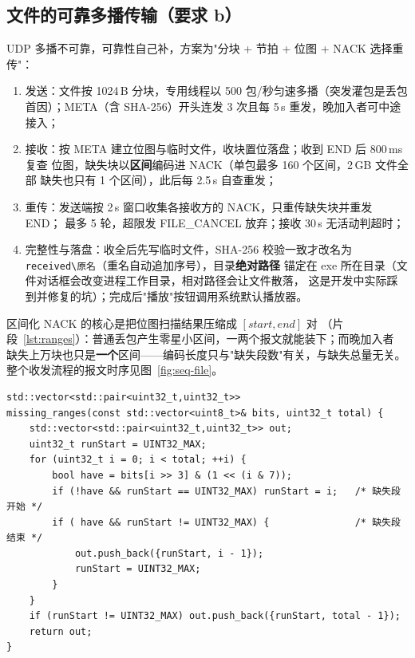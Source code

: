 \documentclass[11pt,a4paper,fontset=fandol]{ctexart}
\begin{document}
\subsection{文件的可靠多播传输（要求 b）}

UDP 多播不可靠，可靠性自己补，方案为"分块 + 节拍 + 位图 + NACK 选择重传"：

\begin{enumerate}[itemsep=1pt,topsep=2pt]
  \item 发送：文件按 1024\,B 分块，专用线程以 500 包/秒匀速多播（突发灌包是丢包
        首因）；META（含 SHA-256）开头连发 3 次且每 5\,s 重发，晚加入者可中途接入；
  \item 接收：按 META 建立位图与临时文件，收块置位落盘；收到 END 后 800\,ms 复查
        位图，缺失块以\textbf{区间}编码进 NACK（单包最多 160 个区间，2\,GB 文件全部
        缺失也只有 1 个区间），此后每 2.5\,s 自查重发；
  \item 重传：发送端按 2\,s 窗口收集各接收方的 NACK，只重传缺失块并重发 END；
        最多 5 轮，超限发 FILE\_CANCEL 放弃；接收 30\,s 无活动判超时；
  \item 完整性与落盘：收全后先写临时文件，SHA-256 校验一致才改名为
        \texttt{received\textbackslash 原名}（重名自动追加序号），目录\textbf{绝对路径}
        锚定在 exe 所在目录（文件对话框会改变进程工作目录，相对路径会让文件散落，
        这是开发中实际踩到并修复的坑）；完成后"播放"按钮调用系统默认播放器。
\end{enumerate}

\noindent 区间化 NACK 的核心是把位图扫描结果压缩成 $[start,end]$ 对
（片段~\ref{lst:ranges}）：普通丢包产生零星小区间，一两个报文就能装下；而晚加入者
缺失上万块也只是\textbf{一个}区间——编码长度只与"缺失段数"有关，与缺失总量无关。
整个收发流程的报文时序见图~\ref{fig:seq-file}。

\begin{lstlisting}[caption={core/file\_xfer.cpp：位图 -> 缺失区间列表},label={lst:ranges}]
std::vector<std::pair<uint32_t,uint32_t>>
missing_ranges(const std::vector<uint8_t>& bits, uint32_t total) {
    std::vector<std::pair<uint32_t,uint32_t>> out;
    uint32_t runStart = UINT32_MAX;
    for (uint32_t i = 0; i < total; ++i) {
        bool have = bits[i >> 3] & (1 << (i & 7));
        if (!have && runStart == UINT32_MAX) runStart = i;   /* 缺失段开始 */
        if ( have && runStart != UINT32_MAX) {               /* 缺失段结束 */
            out.push_back({runStart, i - 1});
            runStart = UINT32_MAX;
        }
    }
    if (runStart != UINT32_MAX) out.push_back({runStart, total - 1});
    return out;
}
\end{lstlisting}
\end{document}
